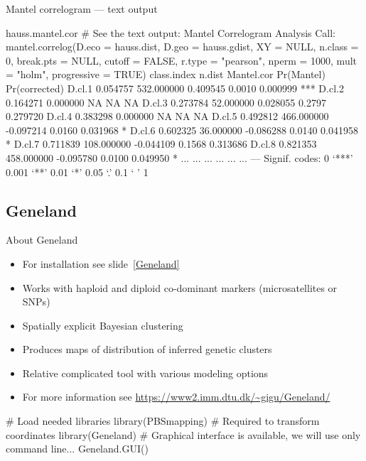 \documentclass[compress, ucs, xelatex, 11pt, xcolor=svgnames,
  hyperref={
    bookmarks=true,
    unicode=true,
    colorlinks=true,
    pdftitle={Molecular data in R},
    plainpages=false,
    pdfauthor={Vojtech Zeisek},
    pdfsubject={Course about phylogeny and evolution in R},
    pdfcreator={XeLaTeX},
    pdfkeywords={R, evolution, phylogeny, molecular data},
    linkcolor=Tomato,
    anchorcolor=SaddleBrown,
    citecolor=Goldenrod,
    filecolor=DarkMagenta,
    menucolor=Sienna,
    urlcolor=DarkTurquoise,
    pdftex},
  url={hyphens, lowtilde} %
  ]{beamer}
\begin{document}
\begin{frame}[fragile]{Mantel correlogram --- text output}
  \begin{spluscode}
    hauss.mantel.cor # See the text output:
    Mantel Correlogram Analysis
    Call:
    mantel.correlog(D.eco = hauss.dist, D.geo = hauss.gdist, XY = NULL,
     n.class = 0, break.pts = NULL, cutoff = FALSE, r.type = "pearson",
     nperm = 1000, mult = "holm", progressive = TRUE) 
            class.index     n.dist Mantel.cor Pr(Mantel) Pr(corrected)
    D.cl.1     0.054757 532.000000   0.409545     0.0010      0.000999 ***
    D.cl.2     0.164271   0.000000         NA         NA            NA
    D.cl.3     0.273784  52.000000   0.028055     0.2797      0.279720
    D.cl.4     0.383298   0.000000         NA         NA            NA
    D.cl.5     0.492812 466.000000  -0.097214     0.0160      0.031968 *
    D.cl.6     0.602325  36.000000  -0.086288     0.0140      0.041958 *
    D.cl.7     0.711839 108.000000  -0.044109     0.1568      0.313686
    D.cl.8     0.821353 458.000000  -0.095780     0.0100      0.049950 *
       ...          ...        ...        ...        ...           ...
    ---
    Signif. codes:  0 ‘***’ 0.001 ‘**’ 0.01 ‘*’ 0.05 ‘.’ 0.1 ‘ ’ 1
  \end{spluscode}
\end{frame}

\subsection{Geneland}

\begin{frame}[fragile]{About Geneland}
  \label{GenelandUse}
  \begin{itemize}
    \item For installation see slide~\ref{Geneland}
    \item Works with haploid and diploid co-dominant markers (microsatellites or SNPs)
    \item Spatially explicit Bayesian clustering
    \item Produces maps of distribution of inferred genetic clusters
    \item Relative complicated tool with various modeling options
    \item For more information see \url{https://www2.imm.dtu.dk/~gigu/Geneland/}
  \end{itemize}
  \vfill
  \begin{spluscode}
    # Load needed libraries
    library(PBSmapping) # Required to transform coordinates
    library(Geneland)
    # Graphical interface is available, we will use only command line...
    Geneland.GUI()
  \end{spluscode}
\end{frame}
\end{document}
